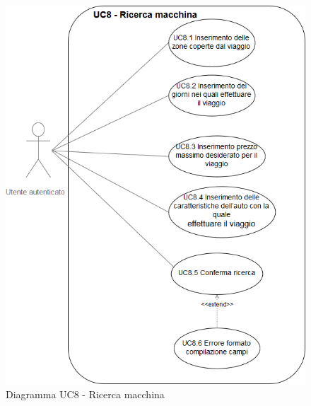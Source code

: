   \begin{figure}[h!]
           \begin{center}
           \includegraphics[scale=0.60]{immagini/8.png}    
           \caption{Diagramma UC8 - Ricerca macchina}
           \end{center}
    \end{figure}  
  
  
        
